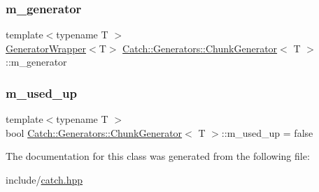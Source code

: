 \subsubsection{\texorpdfstring{m\_generator}{m\_generator}}
{\footnotesize\ttfamily template$<$typename T $>$ \\
\mbox{\hyperlink{class_catch_1_1_generators_1_1_generator_wrapper}{Generator\+Wrapper}}$<$T$>$ \mbox{\hyperlink{class_catch_1_1_generators_1_1_chunk_generator}{Catch\+::\+Generators\+::\+Chunk\+Generator}}$<$ T $>$\+::m\+\_\+generator\hspace{0.3cm}{\ttfamily [private]}}

\mbox{\label{class_catch_1_1_generators_1_1_chunk_generator_a4a5f14d8f6c7a94e5771eb999c1ffe5a}} 
\subsubsection{\texorpdfstring{m\_used\_up}{m\_used\_up}}
{\footnotesize\ttfamily template$<$typename T $>$ \\
bool \mbox{\hyperlink{class_catch_1_1_generators_1_1_chunk_generator}{Catch\+::\+Generators\+::\+Chunk\+Generator}}$<$ T $>$\+::m\+\_\+used\+\_\+up = false\hspace{0.3cm}{\ttfamily [private]}}



The documentation for this class was generated from the following file\+:\begin{DoxyCompactItemize}
\item 
include/\mbox{\hyperlink{catch_8hpp}{catch.\+hpp}}\end{DoxyCompactItemize}
